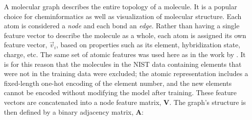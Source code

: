 




A molecular graph describes the entire topology of a molecule. It is a popular
choice for cheminformatics as well as visualization of molecular structure. Each
atom is considered a \emph{node} and each bond an \emph{edge}. Rather than
having a single feature vector to describe the molecule as a whole, each atom is
assigned its own feature vector, $\vec{v}_i$, based on properties such as its
element, hybridization state, charge, etc. The same set of atomic features was
used here as in the work by \citet{qinPredictingCriticalMicelle2021}. It is for
this reason that the molecules in the NIST data containing elements that were
not in the training data were excluded; the atomic representation includes a
fixed-length one-hot encoding of the element number, and the new elements cannot
be encoded without modifying the model after training. These feature vectors are
concatenated into a node feature matrix, $\mathbf{V}$. The graph's structure is
then defined by a binary adjacency matrix, $\mathbf{A}$:

